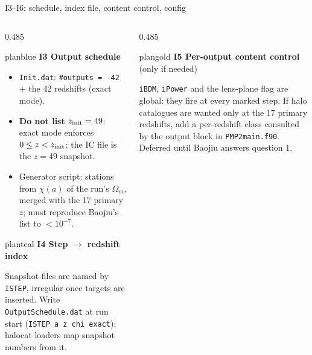 \documentclass[UTF8]{beamer}
\begin{document}
\begin{frame}{I3--I6: schedule, index file, content control, config}
  \footnotesize
  \begin{columns}[T,totalwidth=\textwidth]
    \begin{column}{0.485\textwidth}
      \begin{phasebox}{planblue}
        {\color{planblue}\bfseries I3 Output schedule}\par\smallskip
        \scriptsize
        \begin{itemize}\setlength\itemsep{0.15em}
          \item \texttt{Init.dat}: \texttt{\#outputs = -42} + the 42 redshifts (exact mode).
          \item \textbf{Do not list} $z_{\rm init} = 49$: exact mode enforces $0 \le z < z_{\rm init}$;
                the IC file is the $z=49$ snapshot.
          \item Generator script: stations from $\chi(a)$ of the run's $\Omega_m$, merged with the
                17 primary $z$; must reproduce Baojiu's list to $<10^{-7}$.
        \end{itemize}
      \end{phasebox}
      \vspace{0.3ex}
      \begin{phasebox}{planteal}
        {\color{planteal}\bfseries I4 Step $\to$ redshift index}\par\smallskip
        \scriptsize
        Snapshot files are named by \texttt{ISTEP}, irregular once targets are inserted.
        Write \texttt{OutputSchedule.dat} at run start (\texttt{ISTEP a z chi exact});
        halocat loaders map snapshot numbers from it.
      \end{phasebox}
    \end{column}
    \hfill
    \begin{column}{0.485\textwidth}
      \begin{phasebox}{plangold}
        {\color{plangold}\bfseries I5 Per-output content control} (only if needed)\par\smallskip
        \scriptsize
        \texttt{iBDM}, \texttt{iPower} and the lens-plane flag are global: they fire at every
        marked step. If halo catalogues are wanted only at the 17 primary redshifts, add a
        per-redshift class consulted by the output block in \texttt{PMP2main.f90}.
        Deferred until Baojiu answers question 1.
      \end{phasebox}

\end{column}
\end{columns}
\end{frame}
\end{document}
